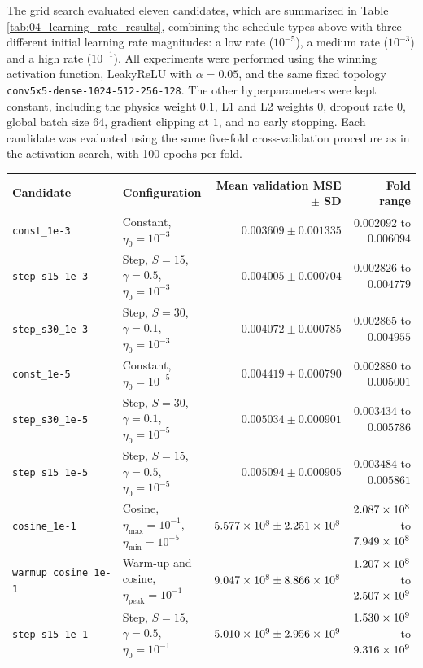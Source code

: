 The grid search evaluated eleven candidates, which are summarized in Table \ref{tab:04_learning_rate_results}, combining the schedule types above with three different initial learning rate magnitudes: a low rate ($10^{-5}$), a medium rate ($10^{-3}$) and a high rate ($10^{-1}$). All experiments were performed using the winning activation function, LeakyReLU with $\alpha=0.05$, and the same fixed topology \texttt{conv5x5-dense-1024-512-256-128}. The other hyperparameters were kept constant, including the physics weight $0.1$, L1 and L2 weights $0$, dropout rate $0$, global batch size $64$, gradient clipping at $1$, and no early stopping. Each candidate was evaluated using the same five-fold cross-validation procedure as in the activation search, with 100 epochs per fold.

\begin{table}[h!]
    \centering
    \begin{tabularx}{\linewidth}{@{}lXrr@{}}
        \hline
        Candidate & Configuration & Mean validation MSE $\pm$ SD & Fold range \\
        \hline
        \texttt{const\_1e-3} & Constant, $\eta_0=10^{-3}$ & $0.003609\pm0.001335$ & $0.002092$ to $0.006094$ \\
        \texttt{step\_s15\_1e-3} & Step, $S=15$, $\gamma=0.5$, $\eta_0=10^{-3}$ & $0.004005\pm0.000704$ & $0.002826$ to $0.004779$ \\
        \texttt{step\_s30\_1e-3} & Step, $S=30$, $\gamma=0.1$, $\eta_0=10^{-3}$ & $0.004072\pm0.000785$ & $0.002865$ to $0.004955$ \\
        \texttt{const\_1e-5} & Constant, $\eta_0=10^{-5}$ & $0.004419\pm0.000790$ & $0.002880$ to $0.005001$ \\
        \texttt{step\_s30\_1e-5} & Step, $S=30$, $\gamma=0.1$, $\eta_0=10^{-5}$ & $0.005034\pm0.000901$ & $0.003434$ to $0.005786$ \\
        \texttt{step\_s15\_1e-5} & Step, $S=15$, $\gamma=0.5$, $\eta_0=10^{-5}$ & $0.005094\pm0.000905$ & $0.003484$ to $0.005861$ \\
        \texttt{cosine\_1e-1} & Cosine, $\eta_{\max}=10^{-1}$, $\eta_{\min}=10^{-5}$ & $5.577\times 10^{8}\pm2.251\times 10^{8}$ & $2.087\times 10^{8}$ to $7.949\times 10^{8}$ \\
        \texttt{warmup\_cosine\_1e-1} & Warm-up and cosine, $\eta_{\mathrm{peak}}=10^{-1}$ & $9.047\times 10^{8}\pm8.866\times 10^{8}$ & $1.207\times 10^{8}$ to $2.507\times 10^{9}$ \\
        \texttt{step\_s15\_1e-1} & Step, $S=15$, $\gamma=0.5$, $\eta_0=10^{-1}$ & $5.010\times 10^{9}\pm2.956\times 10^{9}$ & $1.530\times 10^{9}$ to $9.316\times 10^{9}$ \\

\end{tabularx}
\end{table}
